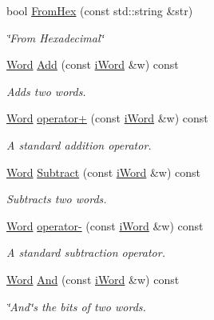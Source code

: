 \begin{DoxyCompactItemize}
bool \hyperlink{classWord_a247de32d413b48d2934f41caaa6cce77}{FromHex} (const std::string \&str)
\begin{DoxyCompactList}\small\item\em \char`\"{}From Hexadecimal\char`\"{} \item\end{DoxyCompactList}\item 
\hyperlink{classWord}{Word} \hyperlink{classWord_ae9478910c6cb8c30abeedf7fc6ba5b36}{Add} (const \hyperlink{classiWord}{iWord} \&w) const 
\begin{DoxyCompactList}\small\item\em Adds two words. \item\end{DoxyCompactList}\item 
\hyperlink{classWord}{Word} \hyperlink{classWord_a0fa830d2d54ba68107d035c316b8d3ab}{operator+} (const \hyperlink{classiWord}{iWord} \&w) const 
\begin{DoxyCompactList}\small\item\em A standard addition operator. \item\end{DoxyCompactList}\item 
\hyperlink{classWord}{Word} \hyperlink{classWord_aef1af160cdcc631473aec52ea883e2e5}{Subtract} (const \hyperlink{classiWord}{iWord} \&w) const 
\begin{DoxyCompactList}\small\item\em Subtracts two words. \item\end{DoxyCompactList}\item 
\hyperlink{classWord}{Word} \hyperlink{classWord_af930dcccdcf2cdbb90df31ac61a4933c}{operator-\/} (const \hyperlink{classiWord}{iWord} \&w) const 
\begin{DoxyCompactList}\small\item\em A standard subtraction operator. \item\end{DoxyCompactList}\item 
\hyperlink{classWord}{Word} \hyperlink{classWord_a08eca1ca0af51daee452ba719f9407c5}{And} (const \hyperlink{classiWord}{iWord} \&w) const 
\begin{DoxyCompactList}\small\item\em \char`\"{}And\char`\"{}s the bits of two words. \item\end{DoxyCompactList}\item 

\end{DoxyCompactItemize}

